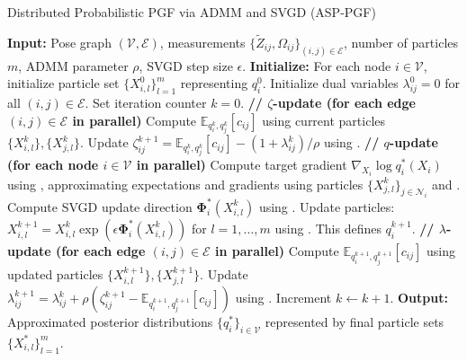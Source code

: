 \begin{algorithm}[H]
\caption{Distributed Probabilistic PGF via ADMM and SVGD (ASP-PGF)}
\label{alg:admm_svgd_pgf}
\begin{algorithmic}[1]
\STATE \textbf{Input:} Pose graph $({\mathcal{V}}, {\mathcal{E}})$, measurements $\{{\tilde{Z}}_{ij}, \Omega_{ij}\}_{(i,j) \in {\mathcal{E}}}$, number of particles $m$, ADMM parameter $\rho$, SVGD step size $\epsilon$.
\STATE \textbf{Initialize:} For each node $i \in {\mathcal{V}}$, initialize particle set $\{X_{i,l}^0\}_{l=1}^m$ representing $q_i^0$. Initialize dual variables $\lambda_{ij}^0 = 0$ for all $(i,j) \in {\mathcal{E}}$. Set iteration counter $k=0$.
\REPEAT
    \STATE \textbf{// $\zeta$-update (for each edge $(i,j) \in {\mathcal{E}}$ in parallel)}
    \STATE Compute $\mathbb{E}_{q_i^k, q_j^k}[c_{ij}]$ using current particles $\{X_{i,l}^k\}, \{X_{j,l}^k\}$.
    \STATE Update $\zeta_{ij}^{k+1} = \mathbb{E}_{q_i^k, q_j^k}[c_{ij}] - (1 + \lambda_{ij}^k)/\rho$ using .
    \STATE \textbf{// $q$-update (for each node $i \in {\mathcal{V}}$ in parallel)}
    \STATE Compute target gradient $\nabla_{X_i} \log q_i^*(X_i)$ using , approximating expectations and gradients using particles $\{X_{j,l}^k\}_{j \in {\mathcal{N}}_i}$ and .
    \STATE Compute SVGD update direction $\boldsymbol{\Phi}_i^*(X_{i,l}^k)$ using .
    \STATE Update particles: $X_{i,l}^{k+1} = X_{i,l}^k \exp(\epsilon \boldsymbol{\Phi}_i^*(X_{i,l}^k))$ for $l=1, \dots, m$ using . This defines $q_i^{k+1}$.
    \STATE \textbf{// $\lambda$-update (for each edge $(i,j) \in {\mathcal{E}}$ in parallel)}
    \STATE Compute $\mathbb{E}_{q_i^{k+1}, q_j^{k+1}}[c_{ij}]$ using updated particles $\{X_{i,l}^{k+1}\}, \{X_{j,l}^{k+1}\}$.
    \STATE Update $\lambda_{ij}^{k+1} = \lambda_{ij}^k + \rho (\zeta_{ij}^{k+1} - \mathbb{E}_{q_i^{k+1}, q_j^{k+1}}[c_{ij}])$ using .
    \STATE Increment $k \leftarrow k+1$.
\STATE \textbf{Output:} Approximated posterior distributions $\{q_i^*\}_{i \in {\mathcal{V}}}$ represented by final particle sets $\{X_{i,l}^*\}_{l=1}^m$.
\end{algorithmic}
\end{algorithm}
